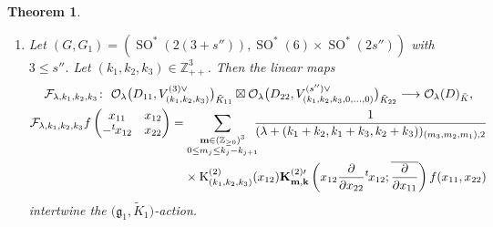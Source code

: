 \documentclass[pdftex]{sigma}
\numberwithin{equation}{section}
\newtheorem{Theorem}{Theorem}[section]
\newcommand{\bK}{\mathbf{K}}
\newcommand{\bk}{\mathbf{k}}
\newcommand{\bl}{\mathbf{l}}
\newcommand{\bm}{\mathbf{m}}
\newcommand{\BZ}{\mathbb{Z}}
\newcommand{\fg}{\mathfrak{g}}
\newcommand{\cF}{\mathcal{F}}
\newcommand{\cO}{\mathcal{O}}
\newcommand{\rK}{\mathrm{K}}
\begin{document}
\begin{Theorem}
\begin{enumerate}
\begin{gather*}
\frac{1}{(\lambda+2k+2l)_{\bm-\bl',4}\left(\lambda+2k+l-2\left\lfloor\frac{s}{2}\right\rfloor+1\right)_{l-l_{\lceil s'/2\rceil}}}\\
\qquad\quad{} \times \rK_{(k+l,\ldots,k+l,k)}^{(2)}(x_{12})
\bK_{\bm,-\bl}^{(4)}\left(x_{12}\frac{\partial}{\partial x_{22}}{}^t\hspace{-1pt}x_{12};
\overline{\frac{\partial}{\partial x_{11}}}\right)f(x_{11},x_{22}) \quad (s'\colon \text{odd})
\end{gather*}
intertwine the $\big(\fg_1,\tilde{K}_1\big)$-action. Here if $s'$ is odd, then for $\bl=(l_1,\ldots,l_{\lfloor s'/2\rfloor},l_{\lceil s'/2\rceil})\in(\BZ_{\ge 0})^{\lceil s'/2\rceil}$,
we write $\bl'=(l_1,\ldots,l_{\lfloor s'/2\rfloor})\in(\BZ_{\ge 0})^{\lfloor s'/2\rfloor}$.
If $s'=s''$ or $\lambda>2s''-3$ or ``$s''=s'+1$ and $\lambda+k>2s''-3$'',
then this extends to the map between the spaces of all holomorphic functions.
\item[$(5)$] Let $(G,G_1)=(\operatorname{SO}^*(2(3+s'')), \operatorname{SO}^*(6)\times \operatorname{SO}^*(2s''))$ with $3\le s''$.
Let $(k_1,k_2,k_3)\in\BZ_{++}^3$. Then the linear maps
\begin{gather*}
\cF_{\lambda,k_1,k_2,k_3}\colon \ \cO_\lambda\big(D_{11},V_{(k_1,k_2,k_3)}^{(3)\vee}\big)_{\tilde{K}_{11}}\boxtimes
\cO_\lambda\big(D_{22},V_{(k_1,k_2,k_3,0,\ldots,0)}^{(s'')\vee}\big)_{\tilde{K}_{22}} \longrightarrow \cO_\lambda(D)_{\tilde{K}},\\
\cF_{\lambda,k_1,k_2,k_3}f\begin{pmatrix}x_{11}&x_{12}\\-{}^t\hspace{-1pt}x_{12}&x_{22}\end{pmatrix}
= \sum_{\substack{\bm\in(\BZ_{\ge 0})^3\\ 0\le m_j\le k_j-k_{j+1}}}\!\!\!
\frac{1}{(\lambda+(k_1+k_2,k_1+k_3,k_2+k_3))_{(m_3,m_2,m_1),2}} \\
\hphantom{\cF_{\lambda,k_1,k_2,k_3}f\begin{pmatrix}x_{11}&x_{12}\\-{}^t\hspace{-1pt}x_{12}&x_{22}\end{pmatrix}=}{} \times\rK_{(k_1,k_2,k_3)}^{(2)}(x_{12})\bK_{\bm,\bk}^{(2)\prime}
\left(x_{12}\frac{\partial}{\partial x_{22}}{}^t\hspace{-1pt}x_{12};
\overline{\frac{\partial}{\partial x_{11}}}\right)f(x_{11},x_{22})
\end{gather*}
intertwine the $\big(\fg_1,\tilde{K}_1\big)$-action.

\end{enumerate}
\end{Theorem}
\end{document}
